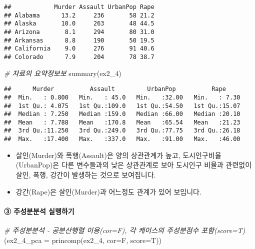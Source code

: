 \documentclass[
]{article}
\newenvironment{Shaded}{\begin{snugshade}}{\end{snugshade}}
\newcommand{\AttributeTok}[1]{\textcolor[rgb]{0.77,0.63,0.00}{#1}}
\newcommand{\CommentTok}[1]{\textcolor[rgb]{0.56,0.35,0.01}{\textit{#1}}}
\newcommand{\FunctionTok}[1]{\textcolor[rgb]{0.00,0.00,0.00}{#1}}
\newcommand{\NormalTok}[1]{#1}
\providecommand{\tightlist}{%
  \setlength{\itemsep}{0pt}\setlength{\parskip}{0pt}}
\begin{document}
\begin{verbatim}
##            Murder Assault UrbanPop Rape
## Alabama      13.2     236       58 21.2
## Alaska       10.0     263       48 44.5
## Arizona       8.1     294       80 31.0
## Arkansas      8.8     190       50 19.5
## California    9.0     276       91 40.6
## Colorado      7.9     204       78 38.7
\end{verbatim}

\begin{Shaded}
\begin{Highlighting}[]
\CommentTok{\# 자료의 요약정보보}
\FunctionTok{summary}\NormalTok{(ex2\_4)}
\end{Highlighting}
\end{Shaded}

\begin{verbatim}
##      Murder          Assault         UrbanPop          Rape      
##  Min.   : 0.800   Min.   : 45.0   Min.   :32.00   Min.   : 7.30  
##  1st Qu.: 4.075   1st Qu.:109.0   1st Qu.:54.50   1st Qu.:15.07  
##  Median : 7.250   Median :159.0   Median :66.00   Median :20.10  
##  Mean   : 7.788   Mean   :170.8   Mean   :65.54   Mean   :21.23  
##  3rd Qu.:11.250   3rd Qu.:249.0   3rd Qu.:77.75   3rd Qu.:26.18  
##  Max.   :17.400   Max.   :337.0   Max.   :91.00   Max.   :46.00
\end{verbatim}

\begin{itemize}
\tightlist
\item
  살인(Murder)와 폭행(Assault)은 양의 상관관계가 높고,
  도시인구비율(UrbanPop)은 다른 변수들과의 낮은 상관관계로 보아 도시인구
  비율과 관련없이 살인, 폭행, 강간이 발생하는 것으로 보여집니다.\\
\item
  강간(Rape)은 살인(Murder)과 어느정도 관계가 있어 보입니다.
\end{itemize}

\hypertarget{uxc8fcuxc131uxbd84uxbd84uxc11d-uxc2e4uxd589uxd558uxae30}{%
\paragraph{③ 주성분분석
실행하기}\label{uxc8fcuxc131uxbd84uxbd84uxc11d-uxc2e4uxd589uxd558uxae30}}

\begin{Shaded}
\begin{Highlighting}[]
\CommentTok{\# 주성분분석 {-} 공분산행렬 이용(cor=F), 각 케이스의 주성분점수 포함(score=T)}
\NormalTok{(}\AttributeTok{ex2\_4\_pca =} \FunctionTok{princomp}\NormalTok{(ex2\_4, }\AttributeTok{cor=}\NormalTok{F, }\AttributeTok{score=}\NormalTok{T))}
\end{Highlighting}
\end{Shaded}
\end{document}
